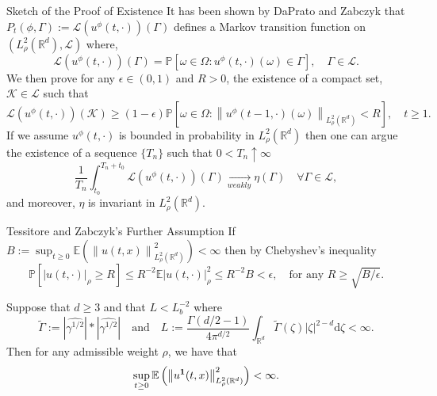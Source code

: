 \documentclass{beamer}%
\numberwithin{equation}{section}
\newcommand{\R}{\mathbb{R}}
\newcommand{\E}{\mathbb{E}}
\newcommand{\Norm}[1]{\left\|  #1   \right\|}
\newcommand{\ud}{\ensuremath{\mathrm{d} }}
\begin{document}
\begin{frame}{Sketch of the Proof of Existence}
	It has been shown by DaPrato and Zabczyk that $P_t(\phi,\Gamma) := \mathscr{L}(u^\phi(t,\cdot))(\Gamma)$ defines a Markov transition function on $(L^2_{\rho}(\R^d), \mathscr{L})$ where,	
		\[
		\mathscr{L}(u^\phi(t,\cdot))(\Gamma) = \mathbb{P}\left[\omega \in \Omega : u^\phi(t,\cdot)(\omega) \in \Gamma \right], \quad \Gamma \in \mathscr{L}.
		\]
	We then prove for any $\epsilon \in (0,1)$ and $R>0$, the existence of a compact set, $\mathcal{K} \in \mathscr{L}$ such that 
		\[
				\mathscr{L}(u^\phi(t,\cdot))(\mathcal{K}) \ge (1-\epsilon)\mathbb{P}\left[\omega \in \Omega : \Norm{u^\phi(t-1,\cdot)(\omega)}_{L^2_{\rho}(\R^d)} < R \right], \quad t \ge 1.
		\]
	If we assume $u^\phi(t,\cdot)$ is bounded in probability in $L^2_{\rho}(\R^d)$ then one can argue the existence of a sequence $\{T_n\}$ such that $0<T_n \uparrow \infty$ 
		\[
				\frac{1}{T_n} \int _{t_0}^{T_n + t_0} 	\mathscr{L}(u^\phi(t,\cdot))(\Gamma) \xrightarrow[weakly]{} \eta(\Gamma) \quad \forall \Gamma \in \mathscr{L},
		\] 
	and moreover, $\eta$ is invariant in $L^2_{\rho}(\R^d)$.
		
\end{frame}


\begin{frame}{Tessitore and Zabczyk's Further Assumption}
	If $B:=\sup_{t \ge 0} \mathbb{E}\left( \Norm{u(t,x)}_{L^2_{\rho}(\R^d)}^2 \right) < \infty$ then by Chebyshev's inequality 
	\[
		\mathbb{P}[|u(t,\cdot)|_\rho \ge R] \le R^{-2}\E |u(t,\cdot)|_\rho^2 \le R^{-2}B < \epsilon, \quad \text{for any } R \ge \sqrt{B/\epsilon}.
	\]
	\begin{theorem}
		Suppose that $d \ge 3$ and that $L < L_b^{-2}$ where 
		\[
			\tilde{\Gamma} := \left|\widehat{\gamma^{1/2}}\right| * \left|\widehat{\gamma^{1/2}}\right| \quad \text{and} \quad L:= \frac{\Gamma(d/2-1)}{4\pi^{d/2}}\int_{\R^d} \tilde\Gamma(\zeta) |\zeta|^{2-d} \ud \zeta < \infty.
		\]
		Then for any admissible weight $\rho$, we have that 
			\[
			\sup_{t \ge 0} \mathbb{E}\left( \Norm{u^{\bf 1}(t,x)}_{L^2_{\rho}(\R^d)}^2 \right) < \infty.
			\]
	\end{theorem}
	\end{frame}
\end{document}
